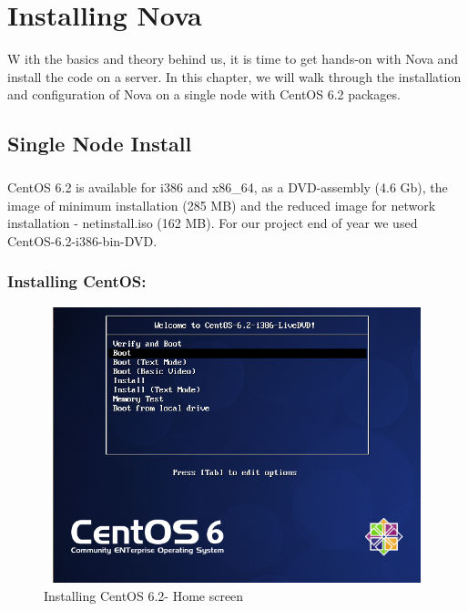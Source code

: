 \chapter{Installing Nova}
\lettrine[lines=3]{W}{} ith the basics and theory behind us, it is time to get hands-on with Nova and install the code on a server. 
In this chapter, we will walk through the installation and configuration of Nova on a single node with CentOS 6.2 packages.
\section{Single Node Install}
 \paragraph{} CentOS 6.2 is available for i386 and x86\_64, as a DVD-assembly (4.6 Gb),
 the image of minimum installation (285 MB) and the reduced image for network installation - netinstall.iso (162 MB).
For our project end of year we used 
CentOS-6.2-i386-bin-DVD.\par

\newpage
\subsection{Installing CentOS:}
 
\begin{figure}[!h]
\center
\includegraphics[width=13cm, height=8cm]{./images/install/accueil}
\caption{Installing CentOS 6.2- Home screen }
\end{figure}

